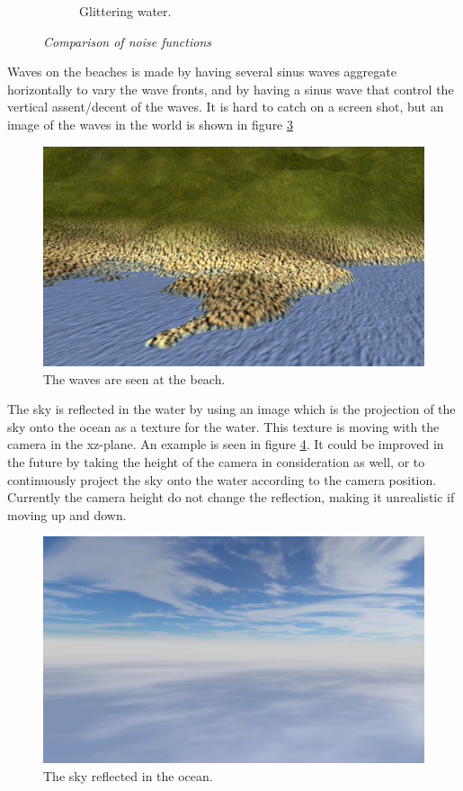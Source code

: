 \begin{figure}[H]
\begin{subfigure}{.5\textwidth}
  \caption{Glittering water.}
  \label{fig:waterGlistering}
\end{subfigure}
\caption[Noise comparison]{\textit{Comparison of noise functions}}
\label{fig:water}
\end{figure}
Waves on the beaches is made by having several sinus waves aggregate horizontally to vary the wave fronts, and by having a sinus wave that control the vertical assent/decent of the waves. It is hard to catch on a screen shot, but an image of the waves in the world is shown in figure \ref{fig:waves}
\begin{figure}[H]
  \centering
  \includegraphics[width=0.9\linewidth]{images/waves.png}
  \caption{The waves are seen at the beach.}
  \label{fig:waves}
\end{figure}%
The sky is reflected in the water by using an image which is the projection of the sky onto the ocean as a texture for the water. This texture is moving with the camera in the xz-plane. An example is seen in figure \ref{fig:skyReflection}. It could be improved in the future by taking the height of the camera in consideration as well, or to continuously project the sky onto the water according to the camera position. Currently the camera height do not change the reflection, making it unrealistic if moving up and down.
\begin{figure}[H]
  \centering
  \includegraphics[width=0.9\linewidth]{images/reflectingSky.png}
  \caption{The sky reflected in the ocean.}
  \label{fig:skyReflection}
\end{figure}%

